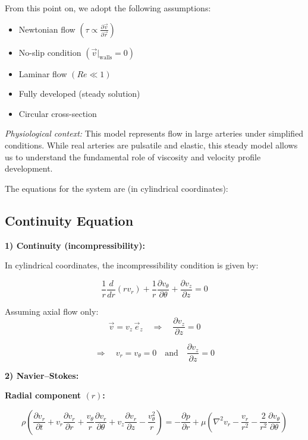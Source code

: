 \documentclass[a4paper,12pt]{article}
\begin{document}
From this point on, we adopt the following assumptions:

\begin{itemize}
    \item Newtonian flow $\left(\tau \propto \frac{\partial \vec{v}}{\partial \vec{r}}\right)$
    \item No-slip condition $\left(\vec{v}|_{\text{walls}}=0\right)$
    \item Laminar flow $(Re \ll 1)$
    \item Fully developed (steady solution)
    \item Circular cross-section
\end{itemize}

\textit{Physiological context:} This model represents flow in large arteries under simplified conditions. While real arteries are pulsatile and elastic, this steady model allows us to understand the fundamental role of viscosity and velocity profile development.


The equations for the system are (in cylindrical coordinates):

\subsection*{Continuity Equation}


\textbf{1) Continuity (incompressibility):}

In cylindrical coordinates, the incompressibility condition is given by:

\[
\frac{1}{r} \frac{d}{dr}(r v_r) + \frac{1}{r} \frac{\partial v_\theta}{\partial \theta} + \frac{\partial v_z}{\partial z} = 0
\]

\medskip

Assuming axial flow only:
\[
\vec{v} = v_z \, \vec{e}_z \quad \Rightarrow \quad \frac{\partial v_z}{\partial z} = 0
\]

\[
\Rightarrow \quad v_r = v_\theta = 0 \quad \text{and} \quad \frac{\partial v_z}{\partial z} = 0
\]



\textbf{2) Navier--Stokes:}

\textbf{Radial component $(r)$:}

\[
\rho \left( \frac{\partial v_r}{\partial t} + v_r \frac{\partial v_r}{\partial r} + \frac{v_\theta}{r} \frac{\partial v_r}{\partial \theta} + v_z \frac{\partial v_r}{\partial z} - \frac{v_\theta^2}{r} \right)
= -\frac{\partial p}{\partial r} + \mu \left( \nabla^2 v_r - \frac{v_r}{r^2} - \frac{2}{r^2} \frac{\partial v_\theta}{\partial \theta} \right)
\]
\end{document}
